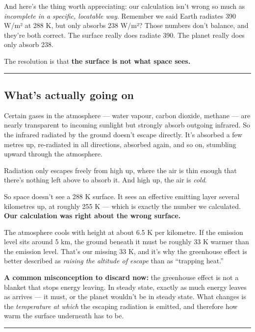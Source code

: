 And here's the thing worth appreciating: our calculation isn't wrong so
much as \emph{incomplete in a specific, locatable way}. Remember we said
Earth radiates 390 W/m² at 288 K, but only absorbs 238 W/m²? Those
numbers don't balance, and they're both correct. The surface really does
radiate 390. The planet really does only absorb 238.

The resolution is that \textbf{the surface is not what space sees.}

\begin{center}\rule{0.5\linewidth}{0.5pt}\end{center}

\subsection{What's actually going on}\label{whats-actually-going-on}

Certain gases in the atmosphere --- water vapour, carbon dioxide,
methane --- are nearly transparent to incoming sunlight but strongly
absorb outgoing infrared. So the infrared radiated by the ground doesn't
escape directly. It's absorbed a few metres up, re-radiated in all
directions, absorbed again, and so on, stumbling upward through the
atmosphere.

Radiation only escapes freely from high up, where the air is thin enough
that there's nothing left above to absorb it. And high up, the air is
\emph{cold}.

So space doesn't see a 288 K surface. It sees an effective emitting
layer several kilometres up, at roughly 255 K --- which is exactly the
number we calculated. \textbf{Our calculation was right about the wrong
surface.}

The atmosphere cools with height at about 6.5 K per kilometre. If the
emission level sits around 5 km, the ground beneath it must be roughly
33 K warmer than the emission level. That's our missing 33 K, and it's
why the greenhouse effect is better described as \emph{raising the
altitude of escape} than as ``trapping heat.''

\textbf{A common misconception to discard now:} the greenhouse effect is
not a blanket that stops energy leaving. In steady state, exactly as
much energy leaves as arrives --- it must, or the planet wouldn't be in
steady state. What changes is the \emph{temperature at which} the
escaping radiation is emitted, and therefore how warm the surface
underneath has to be.

\begin{center}\rule{0.5\linewidth}{0.5pt}\end{center}

